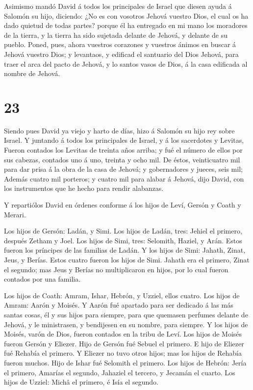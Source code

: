  Asimismo mandó David á todos los principales de Israel que
diesen ayuda á Salomón su hijo, diciendo:  ¿No es con
vosotros Jehová vuestro Dios, el cual os ha dado quietud de todas
partes? porque él ha entregado en mi mano los moradores de la tierra, y
la tierra ha sido sujetada delante de Jehová, y delante de su pueblo.
 Poned, pues, ahora vuestros corazones y vuestros ánimos en
buscar á Jehová vuestro Dios; y levantaos, y edificad el santuario del
Dios Jehová, para traer el arca del pacto de Jehová, y lo santos vasos
de Dios, á la casa edificada al nombre de Jehová.

\hypertarget{section-22}{%
\section{23}\label{section-22}}

 Siendo pues David ya viejo y harto de días, hizo á Salomón
su hijo rey sobre Israel.  Y juntando á todos los
principales de Israel, y á los sacerdotes y Levitas,  Fueron
contados los Levitas de treinta años arriba; y fué el número de ellos
por sus cabezas, contados uno á uno, treinta y ocho mil.  De
éstos, veinticuatro mil para dar prisa á la obra de la casa de Jehová; y
gobernadores y jueces, seis mil;  Además cuatro mil
porteros; y cuatro mil para alabar á Jehová, dijo David, con los
instrumentos que he hecho para rendir alabanzas.

 Y repartiólos David en órdenes conforme á los hijos de
Leví, Gersón y Coath y Merari.

 Los hijos de Gersón: Ladán, y Simi.  Los hijos
de Ladán, tres: Jehiel el primero, después Zetham y Joel. 
Los hijos de Simi, tres: Selomith, Haziel, y Arán. Estos fueron los
príncipes de las familias de Ladán.  Y los hijos de Simi:
Jahath, Zinat, Jeus, y Berías. Estos cuatro fueron los hijos de Simi.
 Jahath era el primero, Zinat el segundo; mas Jeus y Berías
no multiplicaron en hijos, por lo cual fueron contados por una familia.

 Los hijos de Coath: Amram, Ishar, Hebrón, y Uzziel, ellos
cuatro.  Los hijos de Amram: Aarón y Moisés. Y Aarón fué
apartado para ser dedicado á las más santas cosas, él y sus hijos para
siempre, para que quemasen perfumes delante de Jehová, y le ministrasen,
y bendijesen en su nombre, para siempre.  Y los hijos de
Moisés, varón de Dios, fueron contados en la tribu de Leví.
 Los hijos de Moisés fueron Gersón y Eliezer. 
Hijo de Gersón fué Sebuel el primero.  E hijo de Eliezer
fué Rehabía el primero. Y Eliezer no tuvo otros hijos; mas los hijos de
Rehabía fueron muchos.  Hijo de Ishar fué Selomith el
primero.  Los hijos de Hebrón: Jería el primero, Amarías el
segundo, Jahaziel el tercero, y Jecamán el cuarto.  Los
hijos de Uzziel: Michâ el primero, é Isía el segundo.

